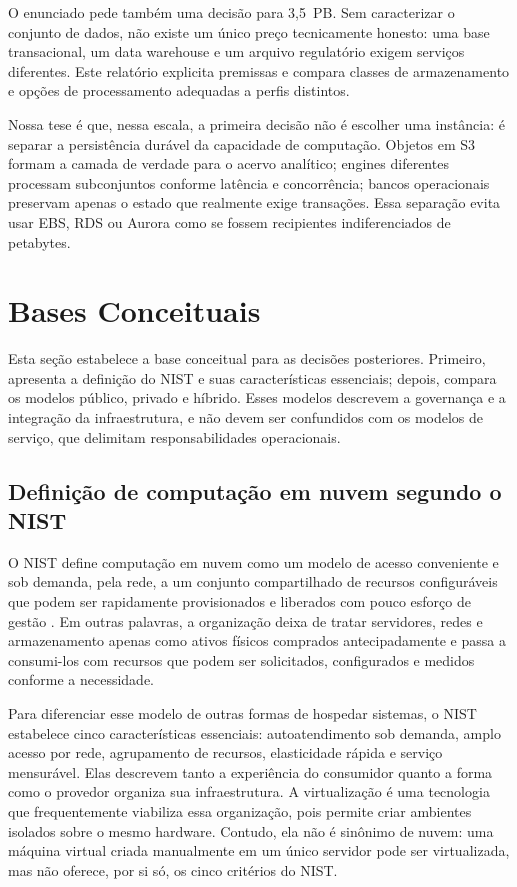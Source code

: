 \documentclass[11pt,a4paper]{article}
\begin{document}
O enunciado pede também uma decisão para 3,5~PB. Sem caracterizar o conjunto de dados, não existe
um único preço tecnicamente honesto: uma base transacional, um data warehouse e um arquivo regulatório
exigem serviços diferentes. Este relatório explicita premissas e compara classes de armazenamento e opções de processamento adequadas a perfis distintos.

Nossa tese é que, nessa escala, a primeira decisão não é escolher uma instância: é separar a
persistência durável da capacidade de computação. Objetos em S3 formam a camada de verdade para o
acervo analítico; engines diferentes processam subconjuntos conforme latência e concorrência; bancos
operacionais preservam apenas o estado que realmente exige transações. Essa separação evita usar
EBS, RDS ou Aurora como se fossem recipientes indiferenciados de petabytes.


\section{Bases Conceituais}\label{sec:foundations}
Esta seção estabelece a base conceitual para as decisões posteriores. Primeiro, apresenta a definição
do NIST e suas características essenciais; depois, compara os modelos público, privado e híbrido.
Esses modelos descrevem a governança e a integração da infraestrutura, e não devem ser confundidos
com os modelos de serviço, que delimitam responsabilidades operacionais.

\subsection{Definição de computação em nuvem segundo o NIST}
O NIST define computação em nuvem como um modelo de acesso conveniente e sob demanda, pela rede,
a um conjunto compartilhado de recursos configuráveis que podem ser rapidamente provisionados e
liberados com pouco esforço de gestão \cite{nist}. Em outras palavras, a organização deixa de
tratar servidores, redes e armazenamento apenas como ativos físicos comprados antecipadamente e passa
a consumi-los com recursos que podem ser solicitados, configurados e medidos conforme a necessidade.

Para diferenciar esse modelo de outras formas de hospedar sistemas, o NIST estabelece cinco
características essenciais: autoatendimento sob demanda, amplo acesso por rede, agrupamento de
recursos, elasticidade rápida e serviço mensurável. Elas descrevem tanto a experiência do consumidor
quanto a forma como o provedor organiza sua infraestrutura. A virtualização é uma tecnologia que
frequentemente viabiliza essa organização, pois permite criar ambientes isolados sobre o mesmo
hardware. Contudo, ela não é sinônimo de nuvem: uma máquina virtual criada manualmente em um único
servidor pode ser virtualizada, mas não oferece, por si só, os cinco critérios do NIST.
\end{document}
